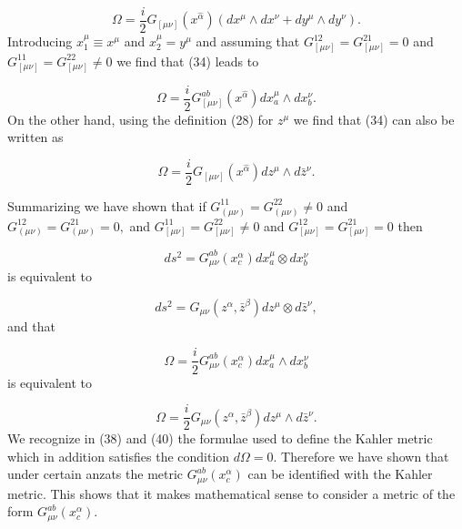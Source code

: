 \documentclass[a4paper,12pt]{article}
\begin{document}
\begin{equation}
\Omega =\frac{i}{2}G_{[\mu \nu ]}(x^{\hat{\alpha}})(dx^{\mu }\wedge dx^{\nu
}+dy^{\mu }\wedge dy^{\nu }).  \label{34}
\end{equation}
Introducing $x_{1}^{\mu }\equiv x^{\mu }$ and $x_{2}^{\mu }=y^{\mu }$ and
assuming that $G_{[\mu \nu ]}^{12}=G_{[\mu \nu ]}^{21}=0$ and $G_{[\mu \nu
]}^{11}=G_{[\mu \nu ]}^{22}\neq 0$ we find that (34) leads to

\begin{equation}
\Omega =\frac{i}{2}G_{[\mu \nu ]}^{ab}(x^{\hat{\alpha}})dx_{a}^{\mu }\wedge
dx_{b}^{\nu }.  \label{35}
\end{equation}
On the other hand, using the definition (28) for $z^{\mu }$ we find that
(34) can also be written as

\begin{equation}
\Omega =\frac{i}{2}G_{[\mu \nu ]}(x^{\hat{\alpha}})dz^{\mu }\wedge d\bar{z}%
^{\nu }.  \label{36}
\end{equation}

Summarizing we have shown that if $G_{(\mu \nu )}^{11}=G_{(\mu \nu
)}^{22}\neq 0$ and $G_{(\mu \nu )}^{12}=G_{(\mu \nu )}^{21}=0,$ and $G_{[\mu
\nu ]}^{11}=G_{[\mu \nu ]}^{22}\neq 0$ and $G_{[\mu \nu ]}^{12}=G_{[\mu \nu
]}^{21}=0$ then

\begin{equation}
ds^{2}=G_{\mu \nu }^{ab}(x_{c}^{\alpha })dx_{a}^{\mu }\otimes dx_{b}^{\nu }
\label{37}
\end{equation}
is equivalent to

\begin{equation}
ds^{2}=G_{\mu \nu }(z^{\alpha },\bar{z}^{\beta })dz^{\mu }\otimes d\bar{z}%
^{\nu },  \label{38}
\end{equation}
and that

\begin{equation}
\Omega =\frac{i}{2}G_{\mu \nu }^{ab}(x_{c}^{\alpha })dx_{a}^{\mu }\wedge
dx_{b}^{\nu }  \label{39}
\end{equation}
is equivalent to

\begin{equation}
\Omega =\frac{i}{2}G_{\mu \nu }(z^{\alpha },\bar{z}^{\beta })dz^{\mu }\wedge
d\bar{z}^{\nu }.  \label{40}
\end{equation}
We recognize in (38) and (40) the formulae used to define the Kahler metric
which in addition satisfies the condition $d\Omega =0$. Therefore we have
shown that under certain anzats the metric $G_{\mu \nu }^{ab}(x_{c}^{\alpha
})$ can be identified with the Kahler metric. This shows that it makes
mathematical sense to consider a metric of the form $G_{\mu \nu
}^{ab}(x_{c}^{\alpha }).$
\end{document}
